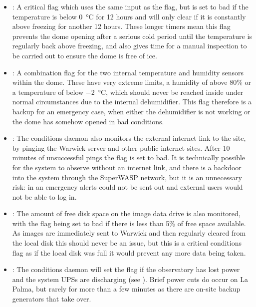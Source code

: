 \begin{colsection}
\begin{colsection}
\begin{itemize}
    \item {}: A critical flag which uses the same input as the  flag, but is set to bad if the temperature is below \SI{0}{\celsius} for 12 hours and will only clear if it is constantly above freezing for another 12 hours. These longer timers mean this flag prevents the dome opening after a serious cold period until the temperature is regularly back above freezing, and also gives time for a manual inspection to be carried out to ensure the dome is free of ice.

    \item {}: A combination flag for the two internal temperature and humidity sensors within the dome. These have very extreme limits, a humidity of above 80\% or a temperature of below \SI{-2}{\celsius}, which should never be reached inside under normal circumstances due to the internal dehumidifier. This flag therefore is a backup for an emergency case, when either the dehumidifier is not working or the dome has somehow opened in bad conditions.

    \item {}: The conditions daemon also monitors the external internet link to the site, by pinging the Warwick server and other public internet sites. After 10 minutes of unsuccessful pings the flag is set to bad. It is technically possible for the system to observe without an internet link, and there is a backdoor into the system through the SuperWASP network, but it is an unnecessary risk: in an emergency alerts could not be sent out and external users would not be able to log in.

    \item {}: The amount of free disk space on the image data drive is also monitored, with the flag being set to bad if there is less than 5\% of free space available. As images are immediately sent to Warwick and then regularly cleared from the local disk this should never be an issue, but this is a critical conditions flag as if the local disk was full it would prevent any more data being taken.

    \item {}: The conditions daemon will set the  flag if the observatory has lost power and the system UPSs are discharging (see ). Brief power cuts do occur on La Palma, but rarely for more than a few minutes as there are on-site backup generators that take over.


\end{itemize}
\end{colsection}
\end{colsection}
